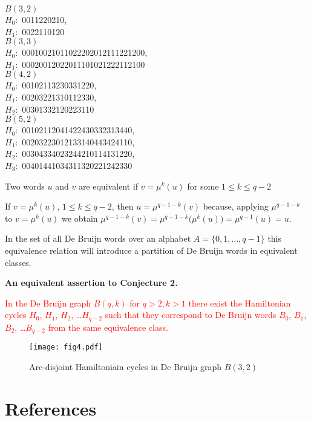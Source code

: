 \documentclass[10pt]{article}
\begin{document}
\medskip\noindent 
{$B(3,2)$}\\
$H_0:$ {0011220210}, \\ $H_1:$  {0022110120}\\
{$B(3,3)$} \\
$H_0:$ {00010021011022202012111221200}, \\
$H_1:$ {00020012022011101021222112100}
\\
{$B(4,2)$}\\  $H_0:$ {00102113230331220}, \\ 
$H_1:$ {00203221310112330}, \\
$H_2:$ {00301332120223110}  
\\
{$B(5,2)$} \\
 $H_0:$ {00102112041422430332313440},\\  
$H_1:$ {00203223012133140443424110},  \\
 $H_2:$ {00304334023244210114131220}, \\
 $H_3:$ {00401441034311320221242330}


\medskip\noindent
Two words $u$ and $v$ are equivalent if $v=\mu^k(u)$ for some $1\le k\le q-2$ 

\medskip\noindent 
If $v=\mu^k(u)$, $1\le k\le q-2$, then $u=\mu^{q-1-k}(v)$ because, applying $\mu^{q-1-k}$ to $v=\mu^k(u)$ we obtain
$\mu^{q-1-k}(v)=\mu^{q-1-k}\big(\mu^k(u)\big) = \mu^{q-1}(u)=u.$

\medskip\noindent
In the set of all De Bruijn words over an alphabet $A=\{0,1,\ldots, q-1\}$ this equivalence relation will introduce a partition of De Bruijn words in equivalent classes.


\medskip\noindent
\textbf{{An equivalent assertion to Conjecture 2.}}

\medskip\noindent\textcolor{red}{In the De Bruijn graph {$B(q,k)$} for {$q>2, k>1$} there exist the Hamiltonian cycles  $H_0$, $H_1$, $H_2$, \ldots $H_{q-2}$ such that they correspond to De Bruijn words $B_0$, $B_1$, $B_2$, \ldots $B_{q-2}$ from the same equivalence class.}


\begin{figure}
\centering\texttt{[image: fig4.pdf]}
\caption{Arc-disjoint Hamiltoniain cycles in De Bruijn graph $B(3,2)$}
\end{figure}

\newpage\section*{References}
          
\end{document}
